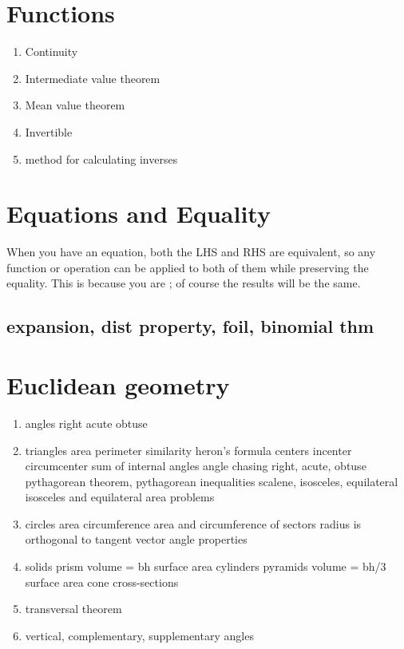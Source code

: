 \documentclass[12pt,paper=letter]{scrartcl}
\begin{document}
    \section{Functions}

    \begin{enumerate}
        \item Continuity
        \item Intermediate value theorem
        \item Mean value theorem
        \item Invertible
        \item method for calculating inverses
    \end{enumerate}


    \section{Equations and Equality}
    When you have an equation,
    both the LHS and RHS are equivalent,
    so any function or operation can be applied to both of them while preserving the equality.
    This is because you are ;
    of course the results will be the same.

    \subsection{expansion, dist property, foil, binomial thm}


    \section{Euclidean geometry}

    \begin{enumerate}
        \item angles
        \subitem right
        \subitem acute
        \subitem obtuse
        \item triangles
        \subitem area
        \subitem perimeter
        \subitem similarity
        \subitem heron's formula
        \subitem centers
        \subsubitem incenter
        \subsubitem circumcenter
        \subitem sum of internal angles
        \subsubitem angle chasing
        \subitem right, acute, obtuse
        \subsubitem pythagorean theorem, pythagorean inequalities
        \subitem scalene, isosceles, equilateral
        \subsubitem isosceles and equilateral area problems
        \item circles
        \subitem area
        \subitem circumference
        \subitem area and circumference of sectors
        \subitem radius is orthogonal to tangent vector
        \subitem angle properties
        \item solids
        \subitem prism
        \subsubitem volume = bh
        \subsubitem surface area
        \subitem cylinders
        \subitem pyramids
        \subsubitem volume = bh/3
        \subsubitem surface area
        \subitem cone
        \subitem cross-sections
        \item transversal theorem
        \item vertical, complementary, supplementary angles
    \end{enumerate}
\end{document}
